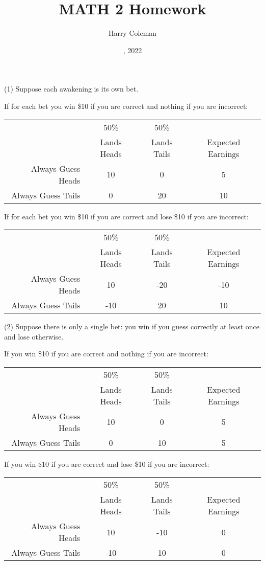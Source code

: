 \documentclass[12pt]{article}
\renewcommand{\maketitle}{\thispagestyle{title}}
\theoremstyle{definition}
\newcommand{\<}{\langle}
\renewcommand{\>}{\rangle}
\begin{document}
\title{MATH 2 Homework }
\author{Harry Coleman}
\date{, 2022}
\maketitle



(1) Suppose each awakening is its own bet.

If for each bet you win \$10 if you are correct and nothing if you are incorrect:
\begin{center}
    \begin{tabular}{r||cc|c}
        & 50\% & 50\% \\
        & Lands Heads & Lands Tails & Expected Earnings \\
        \hline
        Always Guess Heads & 10 & 0 & 5 \\
        Always Guess Tails & 0 & 20 & 10 \\
    \end{tabular}
\end{center}

If for each bet you win \$10 if you are correct and lose \$10 if you are incorrect:
\begin{center}
    \begin{tabular}{r||cc|c}
        & 50\% & 50\% \\
        & Lands Heads & Lands Tails & Expected Earnings \\
        \hline
        Always Guess Heads & 10 & -20 & -10 \\
        Always Guess Tails & -10 & 20 & 10 \\
    \end{tabular}
\end{center}

(2) Suppose there is only a single bet: you win if you guess correctly at least once and lose otherwise.

If you win \$10 if you are correct and nothing if you are incorrect:
\begin{center}
    \begin{tabular}{r||cc|c}
        & 50\% & 50\% \\
        & Lands Heads & Lands Tails & Expected Earnings \\
        \hline
        Always Guess Heads & 10 & 0 & 5 \\
        Always Guess Tails & 0 & 10 & 5 \\
    \end{tabular}
\end{center}

If you win \$10 if you are correct and lose \$10 if you are incorrect:
\begin{center}
    \begin{tabular}{r||cc|c}
        & 50\% & 50\% \\
        & Lands Heads & Lands Tails & Expected Earnings \\
        \hline
        Always Guess Heads & 10 & -10 & 0 \\
        Always Guess Tails & -10 & 10 & 0 \\
    \end{tabular}
\end{center}
\end{document}
